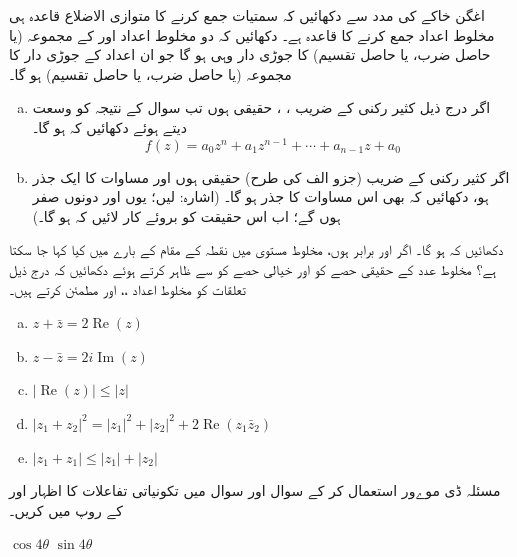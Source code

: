 اغگن خاکے کی مدد سے دکھائیں کہ  سمتیات جمع کرنے  کا متوازی الاضلاع قاعدہ ہی  مخلوط اعداد  جمع کرنے کا قاعدہ     ہے۔
دکھائیں کہ دو مخلوط اعداد  اور   کے مجموعہ (یا حاصل ضرب، یا حاصل تقسیم)  کا جوڑی دار وہی ہو گا جو ان اعداد   کے جوڑی دار کا مجموعہ (یا حاصل ضرب، یا حاصل تقسیم) ہو گا۔
\begin{enumerate}[a.]
\item
اگر درج ذیل کثیر رکنی   کے ضریب  ، ،  حقیقی  ہوں  تب سوال  کے نتیجہ کو وسعت دیتے ہوئے دکھائیں کہ     ہو گا۔
\[f(z)=a_0z^n+a_1z^{n-1}+\cdots+a_{n-1}z+a_0\]
\item
اگر کثیر رکنی  کے ضریب  (جزو  الف کی طرح) حقیقی ہوں اور مساوات     کا  ایک جذر  ہو،  دکھائیں کہ   بھی اس مساوات کا جذر ہو گا۔ (اشارہ:  لیں؛ یوں  اور  دونوں صفر ہوں گے؛ اب اس حقیقت کو بروئے کار لائیں کہ  ہو گا۔)
\end{enumerate}
دکھائیں کہ  ہو گا۔
اگر  اور  برابر ہوں، مخلوط مستوی میں نقطہ  کے مقام کے بارے میں  کیا کہا جا سکتا ہے؟
مخلوط عدد  کے حقیقی حصے کو  اور خیالی حصے کو  سے ظاہر کرتے ہوئے دکھائیں کہ درج ذیل تعلقات  کو  مخلوط اعداد  ،، اور  مطمئن کرتے ہیں۔
\begin{enumerate}[a.]
\item
\(z+\bar{z}=2 \operatorname{Re}(z)\)
\item
\(z-\bar{z}=2i\operatorname{Im}(z)\)
\item
\(|\operatorname{Re}(z)|\le |z|\)
\item
\(|z_1+z_2|^2=|z_1|^2+|z_2|^2+2\operatorname{Re}(z_1\bar{z}_2)\)
\item
\(|z_1+z_1|\le |z_1|+|z_2|\)
\end{enumerate}

مسئلہ ڈی موےور استعمال کر کے سوال   اور سوال  میں تکونیاتی تفاعلات کا اظہار  اور  کے روپ میں  کریں۔

\(\cos 4\theta\)
\wf{\unexpanded{
$\cos^4\theta-6\cos^2\theta\sin^2\theta+\sin^4\theta$
}}
\(\sin 4\theta\)

